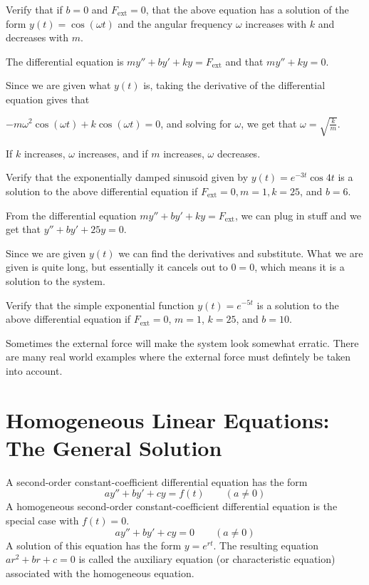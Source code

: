 \documentclass[../diffeq.tex]{subfiles}
\begin{document}
\begin{example}
    Verify that if $b=0$ and $F_{\text{ext}}=0$, that the above equation has a solution of the form $y(t)=\cos(\omega t)$ and the angular frequency $\omega$ increases with $k$ and decreases with $m$.

    The differential equation is $my''+by'+ky=F_{\text{ext}}$ and that $my''+ky=0$.

    Since we are given what $y(t)$ is, taking the derivative of the differential equation gives that 
    
    $-m\omega^2\cos(\omega t)+k\cos(\omega t)=0$, and solving for $\omega$, we get that $\omega=\sqrt{\frac{k}{m}}$.

    If $k$ increases, $\omega$ increases, and if $m$ increases, $\omega$ decreases.
\end{example}

\pagebreak
\begin{example}
    Verify that the exponentially damped sinusoid given by $y(t)=e^{-3t}\cos 4t$ is a solution to the above differential equation if $F_{\text{ext}}=0, m=1, k=25$, and $b=6$.

    From the differential equation $my''+by'+ky=F_{\text{ext}}$, we can plug in stuff and we get that $y''+by'+25y=0$.

    Since we are given $y(t)$ we can find the derivatives and substitute. What we are given is quite long, but essentially it cancels out to $0=0$, which means it is a solution to the system.
\end{example}

\ex Verify that the simple exponential function $y(t)=e^{-5t}$ is a solution to the above differential equation if $F_{\text{ext}}=0$, $m=1$, $k=25$, and $b=10$.

Sometimes the external force will make the system look somewhat erratic. There are many real world examples where the external force must defintely be taken into account.

\section{Homogeneous Linear Equations: The General Solution}
A second-order constant-coefficient differential equation has the form 
\[ ay''+by'+cy=f(t) \qquad (a\neq 0) \]
A homogeneous second-order constant-coefficient differential equation is the special case with $f(t)=0$.
\[ ay''+by'+cy=0 \qquad (a\neq 0) \]
A solution of this equation has the form $y=e^{rt}$. The resulting equation $ar^2+br+c=0$ is called the auxiliary equation (or characteristic equation) associated with the homogeneous equation.
\end{document}
